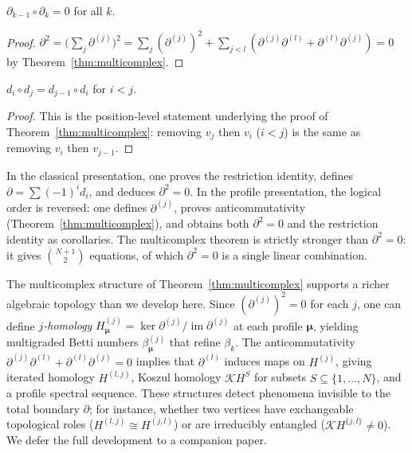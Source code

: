 \begin{corollary}[$\partial^2 = 0$]\label{thm:boundary-squared}
$\partial_{k-1} \circ \partial_k = 0$ for all $k$.
\end{corollary}

\begin{proof}
$\partial^2 = \bigl(\sum_j \partial^{(j)}\bigr)^2 = \sum_j (\partial^{(j)})^2 + \sum_{j < l}(\partial^{(j)}\partial^{(l)} + \partial^{(l)}\partial^{(j)}) = 0$ by Theorem~\ref{thm:multicomplex}.
\end{proof}

\begin{corollary}\label{prop:restriction-identity}
$d_i \circ d_j = d_{j-1} \circ d_i$ for $i < j$.
\end{corollary}

\begin{proof}
This is the position-level statement underlying the proof of Theorem~\ref{thm:multicomplex}: removing $v_j$ then $v_i$ ($i < j$) is the same as removing $v_i$ then $v_{j-1}$.
\end{proof}

\begin{remark}\label{rem:logical-dependence}
In the classical presentation, one proves the restriction identity, defines $\partial = \sum (-1)^i d_i$, and deduces $\partial^2 = 0$. In the profile presentation, the logical order is reversed: one defines $\partial^{(j)}$, proves anticommutativity (Theorem~\ref{thm:multicomplex}), and obtains both $\partial^2 = 0$ and the restriction identity as corollaries. The multicomplex theorem is strictly stronger than $\partial^2 = 0$: it gives $\binom{N+1}{2}$ equations, of which $\partial^2 = 0$ is a single linear combination.
\end{remark}

\begin{remark}\label{rem:profile-future}
The multicomplex structure of Theorem~\ref{thm:multicomplex} supports a richer algebraic topology than we develop here. Since $(\partial^{(j)})^2 = 0$ for each $j$, one can define \emph{$j$-homology} $H^{(j)}_{\boldsymbol{\mu}} = \ker \partial^{(j)} / \operatorname{im} \partial^{(j)}$ at each profile $\boldsymbol{\mu}$, yielding multigraded Betti numbers $\beta^{(j)}_{\boldsymbol{\mu}}$ that refine $\beta_k$. The anticommutativity $\partial^{(j)}\partial^{(l)} + \partial^{(l)}\partial^{(j)} = 0$ implies that $\partial^{(l)}$ induces maps on $H^{(j)}$, giving iterated homology $H^{(l,j)}$, Koszul homology $\mathcal{K}H^S$ for subsets $S \subseteq \{1, \ldots, N\}$, and a profile spectral sequence. These structures detect phenomena invisible to the total boundary $\partial$; for instance, whether two vertices have exchangeable topological roles ($H^{(l,j)} \cong H^{(j,l)}$) or are irreducibly entangled ($\mathcal{K}H^{\{j,l\}} \neq 0$). We defer the full development to a companion paper.
\end{remark}

